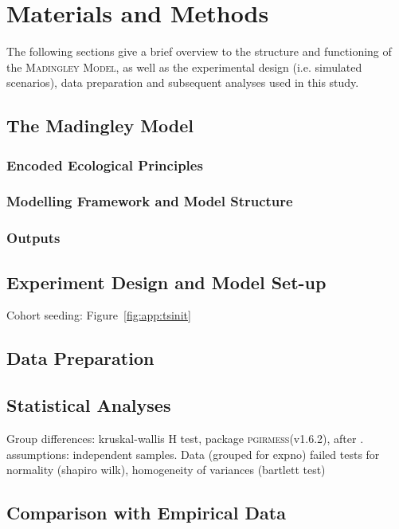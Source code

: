 \chapter{Materials and Methods}
\label{chap:mat}
The following sections give a brief overview to the    structure and functioning of the \textsc{Madingley Model}, as well as the experimental design (i.e. simulated scenarios), data preparation and subsequent analyses used in this study.
\section{The Madingley Model}
\label{chap:mat:madingley}

\subsection{Encoded Ecological Principles}
\label{chap:mat:madingley:princip}

\subsection{Modelling Framework and Model Structure}
\label{chap:mat:madingley:structure}

\subsection{Outputs}
\label{chap:mat:madingley:output}

\section{Experiment Design and Model Set-up}
\label{chap:mat:exp}

Cohort seeding: Figure~\ref{fig:app:tsinit}

\section{Data Preparation}
\label{chap:mat:data}

\section{Statistical Analyses}
\label{chap:mat:stats}

Group differences: kruskal-wallis H test, package \textsc{pgirmess}(v1.6.2), after \cite{Siegel1988}. assumptions: independent samples. Data (grouped for expno) failed tests for normality (shapiro wilk), homogeneity of variances (bartlett test)

\section{Comparison with Empirical Data}
\label{chap:mat:emp}

